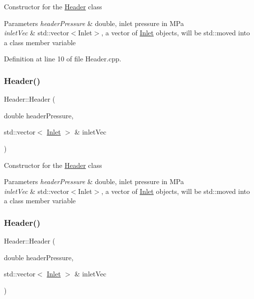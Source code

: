 Constructor for the \hyperlink{class_header}{Header} class


\begin{DoxyParams}{Parameters}
{\em header\+Pressure} & double, inlet pressure in M\+Pa \\
\hline
{\em inlet\+Vec} & std\+::vector$<$\+Inlet$>$, a vector of \hyperlink{class_inlet}{Inlet} objects, will be std\+::moved into a class member variable \\
\hline
\end{DoxyParams}


Definition at line 10 of file Header.\+cpp.

\mbox{\label{class_header_a59b836abde0be58bec65ebea1ac67a3b}} 
\subsubsection{\texorpdfstring{Header()}{Header()}\hspace{0.1cm}{\footnotesize\ttfamily [2/3]}}
{\footnotesize\ttfamily Header\+::\+Header (\begin{DoxyParamCaption}\item[{double}]{header\+Pressure,  }\item[{std\+::vector$<$ \hyperlink{class_inlet}{Inlet} $>$ \&}]{inlet\+Vec }\end{DoxyParamCaption})}

Constructor for the \hyperlink{class_header}{Header} class


\begin{DoxyParams}{Parameters}
{\em header\+Pressure} & double, inlet pressure in M\+Pa \\
\hline
{\em inlet\+Vec} & std\+::vector$<$\+Inlet$>$, a vector of \hyperlink{class_inlet}{Inlet} objects, will be std\+::moved into a class member variable \\
\hline
\end{DoxyParams}
\mbox{\label{class_header_a59b836abde0be58bec65ebea1ac67a3b}} 
\subsubsection{\texorpdfstring{Header()}{Header()}\hspace{0.1cm}{\footnotesize\ttfamily [3/3]}}
{\footnotesize\ttfamily Header\+::\+Header (\begin{DoxyParamCaption}\item[{double}]{header\+Pressure,  }\item[{std\+::vector$<$ \hyperlink{class_inlet}{Inlet} $>$ \&}]{inlet\+Vec }\end{DoxyParamCaption})}

